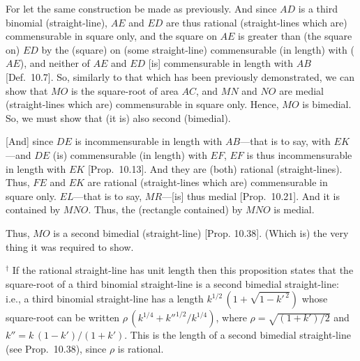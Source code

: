 \begin{Parallel}{}{}
{\epsfysize=1.3in
\centerline{}

For let the same construction be made as  previously. And since
$AD$ is a third binomial (straight-line), $AE$ and $ED$
are thus rational (straight-lines which are) commensurable in square only,
and the square on $AE$ is greater than (the square on) $ED$
by the (square) on (some straight-line) commensurable (in length) with
($AE$), and neither of $AE$ and $ED$ [is] commensurable in length
with $AB$ [Def.~10.7]. So, similarly
to that which has been previously demonstrated, we can show that
$MO$ is the square-root of  area $AC$, and $MN$ and $NO$
are medial (straight-lines which are) commensurable in square only.
Hence, $MO$ is bimedial. So, we must show that (it is)
also second (bimedial).

\mbox{[}And] since $DE$ is incommensurable in length with $AB$---that is to say,
with $EK$---and $DE$ (is) commensurable (in length) with $EF$,
$EF$ is thus incommensurable in length with $EK$ [Prop.~10.13]. And they are (both)
rational (straight-lines). Thus, $FE$ and $EK$ are rational (straight-lines which are) commensurable in square only. $EL$---that is to say, $MR$---[is] thus medial [Prop.~10.21]. And it
is contained by $MNO$.  Thus, the (rectangle contained) by $MNO$
is medial.

Thus, $MO$ is a second bimedial (straight-line) [Prop. 10.38]. (Which is) the very thing it was required to show.}
\end{Parallel}
{\footnotesize\noindent $^\dag$ If the rational straight-line has unit length then this proposition states that the square-root of 
a third binomial straight-line is a second bimedial straight-line: {i.e.}, 
a third binomial straight-line has a length $k^{1/2}\,(1+\sqrt{1-k'^{\,2}})$ whose
square-root can be written $\rho\,(k^{1/4}+k''^{1/2}/k^{1/4})$, where $\rho=\sqrt{(1+k')/2}$ and $k''=k\,(1-k')/(1+k')$. This is the length of a second bimedial straight-line (see Prop.~10.38), since $\rho$ is rational.}

